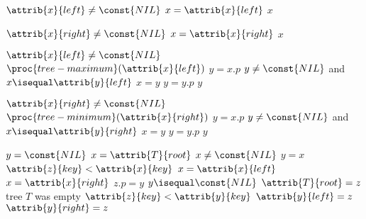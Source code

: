 \documentclass{article}
\begin{document}
\begin{codebox}
\li \While $\attrib{x}{left} \neq \const{NIL}$
    \Do
    \li     $x = \attrib{x}{left}$
    \End
\li \Return $x$
\end{codebox}

\begin{codebox}
\li \While $\attrib{x}{right} \neq \const{NIL}$
    \Do
    \li     $x = \attrib{x}{right}$
    \End
\li \Return $x$
\end{codebox}

\begin{codebox}
\li \If $\attrib{x}{left} \neq \const{NIL}$
\li \Then
        \Return $\proc{tree-maximum}(\attrib{x}{left})$
    \End
\li $y = x.p$
\li \While $y \neq \const{NIL}$ and $x \isequal \attrib{y}{left}$
    \Do
        \li $x = y$ 
        \li $y = y.p$
    \End
\li \Return $y$
\end{codebox}

\begin{codebox}
\li \If $\attrib{x}{right} \neq \const{NIL}$
\li \Then
        \Return $\proc{tree-minimum}(\attrib{x}{right})$
    \End
\li $y = x.p$
\li \While $y \neq \const{NIL}$ and $x \isequal \attrib{y}{right}$
    \Do
        \li $x = y$ 
        \li $y = y.p$
    \End
\li \Return $y$
\end{codebox}

\begin{codebox}
\li $y = \const{NIL}$
\li $x = \attrib{T}{root}$
\li \While $x \neq \const{NIL}$
    \Do
    \li     $y = x$
        \li \If $\attrib{z}{key} < \attrib{x}{key}$
        \li \Then
                $x = \attrib{x}{left}$
        \li \Else
        \li     $x = \attrib{x}{right}$
            \End
    \End
\li $z.p = y$
\li \If $y \isequal \const{NIL}$
\li \Then
        $\attrib{T}{root} = z$ \Comment tree $T$ was empty
\li \ElseIf $\attrib{z}{key} < \attrib{y}{key}$
\li \Then
        $\attrib{y}{left} = z$
\li \Else
\li     $\attrib{y}{right} = z$
    \End
    
\end{codebox}
\end{document}
